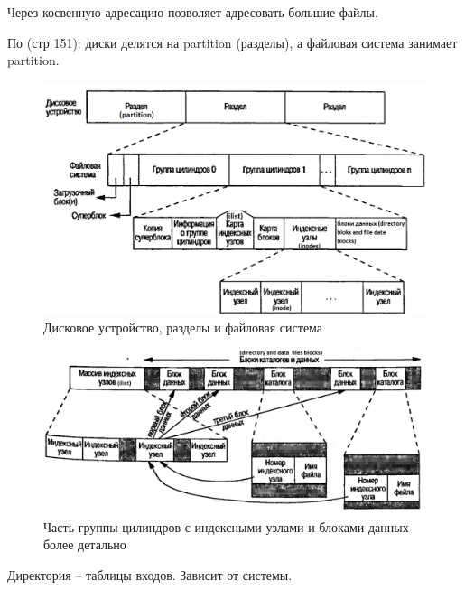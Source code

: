 Через косвенную адресацию позволяет адресовать большие файлы.

По \cite{UNIX_Prof_prog} (стр 151): диски делятся на partition (разделы), а файловая система занимает partition.

\begin{figure}[H]
  \centering
  \includegraphics[width=\textwidth]{pic/8.png}
  \caption{Дисковое устройство, разделы и файловая система}
\end{figure}

\begin{figure}[H]
  \centering
  \includegraphics[width=\textwidth]{pic/6.png}
  \caption{Часть группы цилиндров с индексными узлами и блоками данных более детально}
\end{figure}

Директория – таблицы входов.
Зависит от системы.

 